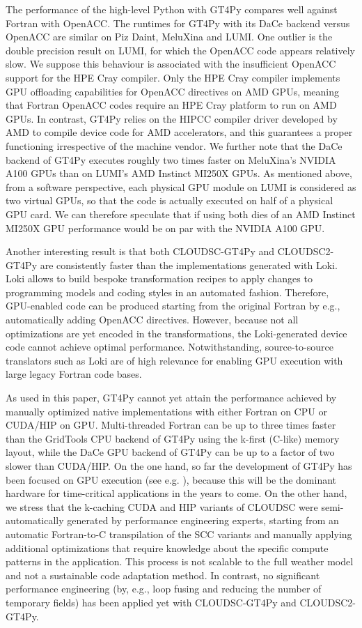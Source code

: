 \documentclass[gmd,manuscript,online]{copernicus}
\theoremstyle{theorem}
\theoremstyle{definition}
\theoremstyle{remark}
\theoremstyle{proposition}
\begin{document}
	The performance of the high-level Python with GT4Py compares well against Fortran with OpenACC. The runtimes for GT4Py with its DaCe backend versus OpenACC are similar on Piz Daint, MeluXina and LUMI. One outlier is the double precision result on LUMI, for which the OpenACC code appears relatively slow. We suppose this behaviour is associated with the insufficient OpenACC support for the HPE Cray compiler. Only the HPE Cray compiler implements GPU offloading capabilities for OpenACC directives on AMD GPUs, meaning that Fortran OpenACC codes require an HPE Cray platform to run on AMD GPUs. In contrast, GT4Py relies on the HIPCC compiler driver developed by AMD to compile device code for AMD accelerators, and this guarantees a proper functioning irrespective of the machine vendor. We further note that the DaCe backend of GT4Py executes roughly two times faster on MeluXina's NVIDIA A100 GPUs than on LUMI's AMD Instinct MI250X GPUs. As mentioned above, from a software perspective, each physical GPU module on LUMI is considered as two virtual GPUs, so that the code is actually executed on half of a physical GPU card. We can therefore speculate that if using both dies of an AMD Instinct MI250X GPU performance would be on par with the NVIDIA A100 GPU.

	Another interesting result is that both CLOUDSC-GT4Py and CLOUDSC2-GT4Py are consistently faster than the implementations generated with Loki. Loki allows to build bespoke transformation recipes to apply changes to programming models and coding styles in an automated fashion. Therefore, GPU-enabled code can be produced starting from the original Fortran by e.g., automatically adding OpenACC directives. However, because not all optimizations are yet encoded in the transformations, the Loki-generated device code cannot achieve optimal performance. Notwithstanding, source-to-source translators such as Loki are of high relevance for enabling GPU execution with large legacy Fortran code bases.

	As used in this paper, GT4Py cannot yet attain the performance achieved by manually optimized native implementations with either Fortran on CPU or CUDA/HIP on GPU. Multi-threaded Fortran can be up to three times faster than the GridTools CPU backend of GT4Py using the k-first (C-like) memory layout, while the DaCe GPU backend of GT4Py can be up to a factor of two slower than CUDA/HIP. On the one hand, so far the development of GT4Py has been focused on GPU execution (see e.g. \cite{dahm23}), because this will be the dominant hardware for time-critical applications in the years to come. On the other hand, we stress that the k-caching CUDA and HIP variants of CLOUDSC were semi-automatically generated by performance engineering experts, starting from an automatic Fortran-to-C transpilation of the SCC variants and manually applying additional optimizations that require knowledge about the specific compute patterns in the application. This process is not scalable to the full weather model and not a sustainable code adaptation method. In contrast, no significant performance engineering (by, e.g., loop fusing and reducing the number of temporary fields) has been applied yet with CLOUDSC-GT4Py and CLOUDSC2-GT4Py.
\end{document}
